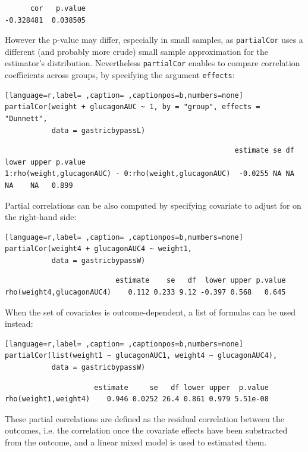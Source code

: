 \documentclass[12pt]{article}
\begin{document}
\begin{verbatim}
      cor   p.value 
-0.328481  0.038505
\end{verbatim}


However the p-value may differ, especially in small samples, as
\texttt{partialCor} uses a different (and probably more crude) small sample
approximation for the estimator's distribution. Nevertheless
\texttt{partialCor} enables to compare correlation coefficients across
groups, by specifying the argument \texttt{effects}:
\begin{lstlisting}[language=r,label= ,caption= ,captionpos=b,numbers=none]
partialCor(weight + glucagonAUC ~ 1, by = "group", effects = "Dunnett",
           data = gastricbypassL)
\end{lstlisting}

\begin{verbatim}
                                                      estimate se df lower upper p.value
1:rho(weight,glucagonAUC) - 0:rho(weight,glucagonAUC)  -0.0255 NA NA    NA    NA   0.899
\end{verbatim}



Partial correlations can be also computed by specifying covariate to
adjust for on the right-hand side:
\begin{lstlisting}[language=r,label= ,caption= ,captionpos=b,numbers=none]
partialCor(weight4 + glucagonAUC4 ~ weight1,
           data = gastricbypassW)
\end{lstlisting}

\begin{verbatim}
                          estimate    se   df  lower upper p.value
rho(weight4,glucagonAUC4)    0.112 0.233 9.12 -0.397 0.568   0.645
\end{verbatim}


When the set of covariates is outcome-dependent, a list of formulas
can be used instead:
\begin{lstlisting}[language=r,label= ,caption= ,captionpos=b,numbers=none]
partialCor(list(weight1 ~ glucagonAUC1, weight4 ~ glucagonAUC4),
           data = gastricbypassW)
\end{lstlisting}

\begin{verbatim}
                     estimate     se   df lower upper  p.value
rho(weight1,weight4)    0.946 0.0252 26.4 0.861 0.979 5.51e-08
\end{verbatim}


These partial correlations are defined as the residual correlation
between the outcomes, i.e. the correlation once the covariate effects
have been substracted from the outcome, and a linear mixed model is
used to estimated them.
\end{document}
